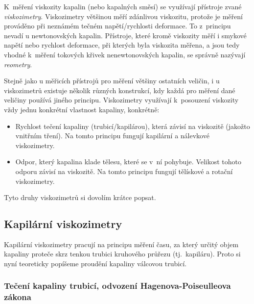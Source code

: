 \documentclass[12pt]{article}
\begin{document}
K~měření viskozity kapalin (nebo kapalných směsí) se využívají přístroje zvané \emph{viskozimetry}. Viskozimetry většinou měří zdánlivou viskozitu, protože je měření prováděno při neznámém tečném napětí/rychlosti deformace. To z~principu nevadí u newtonovských kapalin. Přístroje, které kromě viskozity měří i smykové napětí nebo rychlost deformace, při kterých byla viskozita měřena, a jsou tedy vhodné k~měření tokových křivek nenewtonovských kapalin, se správně nazývají \emph{reometry}.~\cite{wiki:Viscometer}
\par
Stejně jako u měřicích přístrojů pro měření většiny ostatních veličin, i u viskozimetrů existuje několik různých konstrukcí, kdy každá pro měření dané veličiny používá jiného principu. Viskozimetry využívají k~posouzení viskozity vždy jednu konkrétní vlastnost kapaliny, konkrétně:
\begin{itemize}[noitemsep, topsep = 0pt]
    \item Rychlost tečení kapaliny (trubicí/kapilárou), která závisí na viskozitě (jakožto vnitřním tření). Na tomto principu fungují kapilární a nálevkové viskozimetry.
    \item Odpor, který kapalina klade tělesu, které se v~ní pohybuje. Velikost tohoto odporu závisí na viskozitě. Na tomto principu fungují tělískové a rotační viskozimetry.
\end{itemize}
Tyto druhy viskozimetrů si dovolím krátce popsat.

\subsection{Kapilární viskozimetry}%

Kapilární viskozimetry pracují na principu měření času, za který určitý objem kapaliny proteče skrz tenkou trubici kruhového průřezu (tj.~kapiláru). Proto si nyní teoreticky popíšeme proudění kapaliny válcovou trubicí.

\subsubsection{Tečení kapaliny trubicí, odvození Hagenova-Poiseulleova zákona}
\label{sec:tečení_trubicí}%
\end{document}
